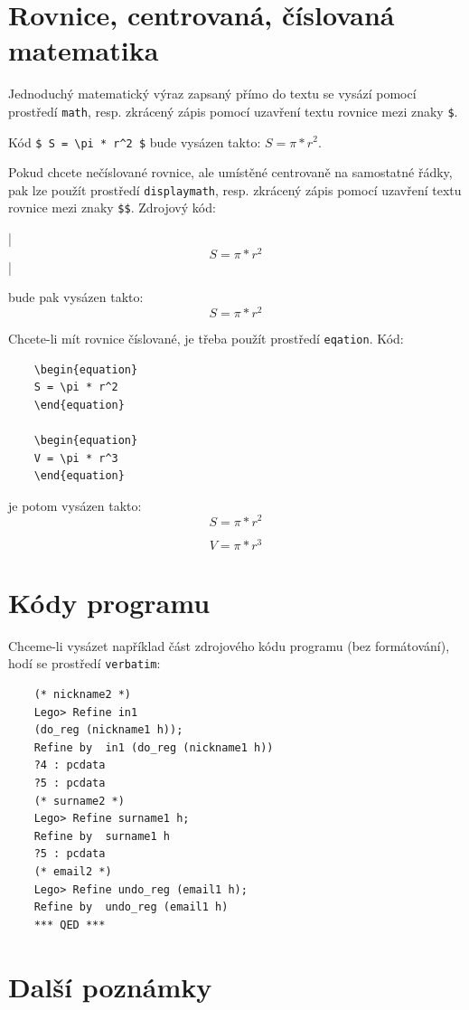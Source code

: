 \documentclass[11pt,twoside,a4paper]{book}
\begin{document}
	\section{Rovnice, centrovaná, číslovaná matematika}
	Jednoduchý matematický výraz zapsaný přímo do textu se vysází pomocí prostředí \verb|math|, resp. zkrácený zápis pomocí uzavření textu rovnice mezi znaky \verb|$|.
	
	Kód \verb|$ S = \pi * r^2 $| bude vysázen takto: $ S = \pi * r^2 $.
	
	Pokud chcete nečíslované rovnice, ale umístěné centrovaně na samostatné řádky, pak lze použít prostředí \verb|displaymath|, resp. zkrácený zápis pomocí uzavření textu rovnice mezi znaky \verb|$$|. Zdrojový kód: 
	\begin{verb}
		|$$ S = \pi * r^2 $$|
	\end{verb}
	bude pak vysázen takto:
	$$ S = \pi * r^2 $$
	
	Chcete-li mít rovnice číslované, je třeba použít prostředí \verb|eqation|. Kód:
	\begin{verbatim}
	\begin{equation}
	S = \pi * r^2
	\end{equation}
	
	\begin{equation}
	V = \pi * r^3
	\end{equation}
	\end{verbatim}
	je potom vysázen takto:
	\begin{equation}
	S = \pi * r^2
	\end{equation}
	
	\begin{equation}
	V = \pi * r^3
	\end{equation}
	
	\section{Kódy programu}
	Chceme-li vysázet například část zdrojového kódu programu (bez formátování), hodí se prostředí \verb|verbatim|: 
	\begin{verbatim}
	(* nickname2 *)
	Lego> Refine in1
	(do_reg (nickname1 h));
	Refine by  in1 (do_reg (nickname1 h))
	?4 : pcdata
	?5 : pcdata
	(* surname2 *)
	Lego> Refine surname1 h;
	Refine by  surname1 h
	?5 : pcdata
	(* email2 *)
	Lego> Refine undo_reg (email1 h);
	Refine by  undo_reg (email1 h)
	*** QED ***
	\end{verbatim}
	
	\section{Další poznámky}
\end{document}
